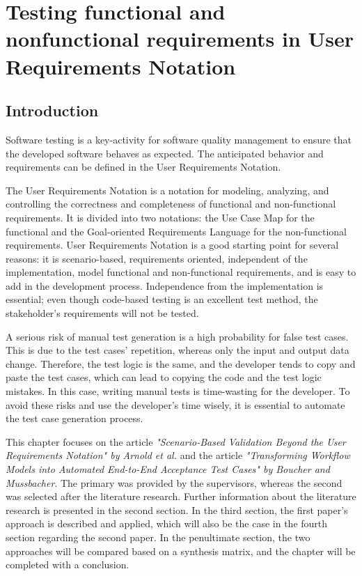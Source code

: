 \chapter{Testing functional and nonfunctional requirements in User Requirements Notation}
\section{Introduction}

Software testing is a key-activity for software quality management to ensure that the developed software behaves as expected. The anticipated behavior and requirements can be defined in the User Requirements Notation. 

The User Requirements Notation is a notation for modeling, analyzing, and controlling the correctness and completeness of functional and non-functional requirements. It is divided into two notations: the Use Case Map for the functional and the Goal-oriented Requirements Language for the non-functional requirements. User Requirements Notation is a good starting point for several reasons: it is scenario-based, requirements oriented, independent of the implementation, model functional and non-functional requirements, and is easy to add in the development process. Independence from the implementation is essential; even though code-based testing is an excellent test method, the stakeholder's requirements will not be tested.

A serious risk of manual test generation is a high probability for false test cases. This is due to the test cases' repetition, whereas only the input and output data change. Therefore, the test logic is the same, and the developer tends to copy and paste the test cases, which can lead to copying the code and the test logic mistakes. In this case, writing manual tests is time-wasting for the developer.  To avoid these risks and use the developer's time wisely, it is essential to automate the test case generation process.

This chapter focuses on the article \textit{"Scenario-Based Validation Beyond the User Requirements Notation" by Arnold et al.}\cite{ArnoldCorriveauShi2010} and the article \textit{"Transforming Workflow Models into Automated End-to-End Acceptance Test Cases" by Boucher and Mussbacher}\cite{BoucherMussbacher2017}. The primary was provided by the supervisors, whereas the second was selected after the literature research. Further information about the literature research is presented in the second section. In the third section, the first paper's approach is described and applied, which will also be the case in the fourth section regarding the second paper. In the penultimate section, the two approaches will be compared based on a synthesis matrix, and the chapter will be completed with a conclusion.

